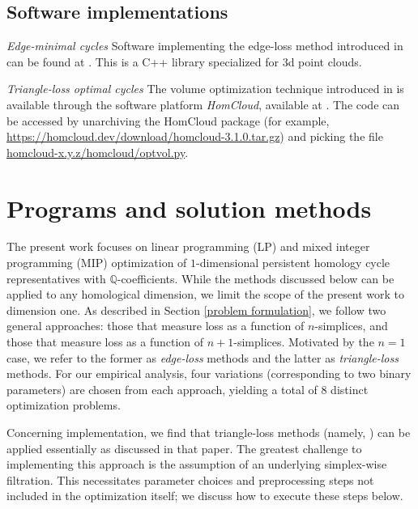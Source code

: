\documentclass[11pt,onecolumn]{article}
\newcommand{\Q}{\mathbb{Q}}
\theoremstyle{plain}
\theoremstyle{definition}
\begin{document}
\subsection{Software implementations}
\label{sec:existingimplementations}

\emph{Edge-minimal cycles}  Software implementing the edge-loss method introduced in \cite{Escolar2016} can be found at \cite{OptiPersLP}.  This is a C++ library specialized for 3d point clouds.


\emph{Triangle-loss optimal cycles} The volume optimization technique introduced in \cite{Obayashi2018} is available through the software platform \emph{HomCloud}, available at  \cite{homcloud}.  The code can be accessed by unarchiving the HomCloud package  (for example,
\url{https://homcloud.dev/download/homcloud-3.1.0.tar.gz}) and picking the
file \url{homcloud-x.y.z/homcloud/optvol.py}.






\section{Programs and solution methods}\label{methodsProblems}
\label{sec:programsandmethods}

The present work focuses on linear  programming (LP) and mixed integer programming (MIP) optimization of $1$-dimensional persistent homology cycle representatives with $\Q$-coefficients. While the methods discussed below can be applied to any homological dimension, we limit the scope of the present work to dimension one. As described in Section \ref{problem formulation}, we follow two general approaches: those that measure loss as a function of $n$-simplices, and those that measure loss as a function of $n+1$-simplices.  Motivated by the $n=1$ case, we refer to the former as \emph{edge-loss} methods and the latter as \emph{triangle-loss} methods.  
For our empirical analysis, four variations (corresponding to two binary parameters) are chosen from each approach, yielding a total of 8 distinct optimization problems. 


Concerning implementation, we find that triangle-loss methods (namely, \cite{Obayashi2018}) can be applied essentially as discussed in that paper.  The greatest challenge to implementing this approach is the assumption of an underlying simplex-wise filtration. This necessitates parameter choices and preprocessing steps not included in the optimization itself; we discuss how to execute these steps below.  
 
\end{document}
